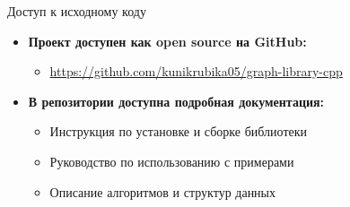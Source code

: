 \documentclass[aspectratio=169]{beamer}
\begin{document}

\begin{frame}{Доступ к исходному коду}
  \begin{itemize}
    \item \textbf{Проект доступен как open source на GitHub:} 
      \begin{itemize}
        \item \url{https://github.com/kunikrubika05/graph-library-cpp}
      \end{itemize}
    \item \textbf{В репозитории доступна подробная документация:}
      \begin{itemize}
        \item Инструкция по установке и сборке библиотеки
        \item Руководство по использованию с примерами
        \item Описание алгоритмов и структур данных
      \end{itemize}
  \end{itemize}
\end{frame}
\end{document}
